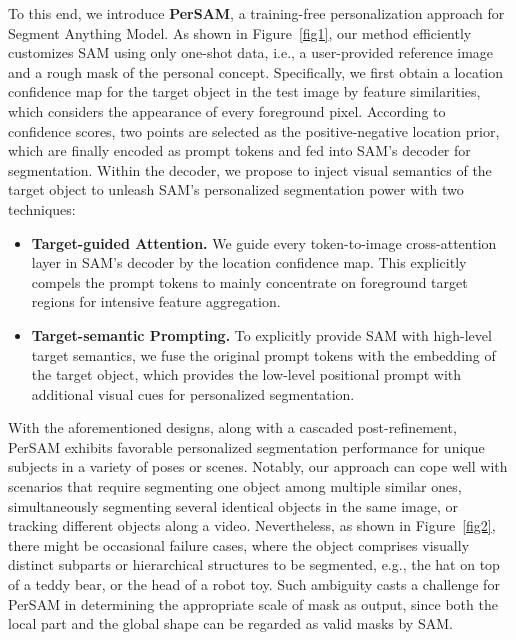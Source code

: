 \documentclass{article} \usepackage{iclr2024_conference,times}
\begin{document}
To this end, we introduce \textbf{PerSAM}, a training-free personalization approach for Segment Anything Model. As shown in Figure~\ref{fig1}, our method efficiently customizes SAM using only one-shot data, i.e., a user-provided reference image and a rough mask of the personal concept. Specifically, we first obtain a location confidence map for the target object in the test image by feature similarities, which considers the appearance of every foreground pixel. According to confidence scores, two points are selected as the positive-negative location prior, which are finally encoded as prompt tokens and fed into SAM's decoder for segmentation. Within the decoder, we propose
to inject visual semantics of the target object to unleash SAM's personalized segmentation power with two techniques:

\begin{itemize}
   \item \textbf{Target-guided Attention.}
    We guide every token-to-image cross-attention layer in SAM's decoder by the location confidence map. This explicitly compels the prompt tokens to mainly concentrate on foreground target regions for intensive feature aggregation.
    

    \item \textbf{Target-semantic Prompting.}
   To explicitly provide SAM with high-level target semantics, we fuse the original prompt tokens with the embedding of the target object, which provides the low-level positional prompt with additional visual cues for personalized segmentation.

\end{itemize}


With the aforementioned designs, along with a cascaded post-refinement, PerSAM exhibits favorable personalized segmentation performance for unique subjects in a variety of poses or scenes. Notably, our approach can cope well with scenarios that require segmenting one object among multiple similar ones, simultaneously segmenting several identical objects in the same image, or tracking different objects along a video.
Nevertheless, as shown in Figure~\ref{fig2}, there might be occasional failure cases, where the object comprises visually distinct subparts or hierarchical structures to be segmented, e.g., the hat on top of a teddy bear, or the head of a robot toy.
Such ambiguity casts a challenge for PerSAM in determining the appropriate scale of mask as output, since both the local part and the global shape can be regarded as valid masks by SAM.
\end{document}
